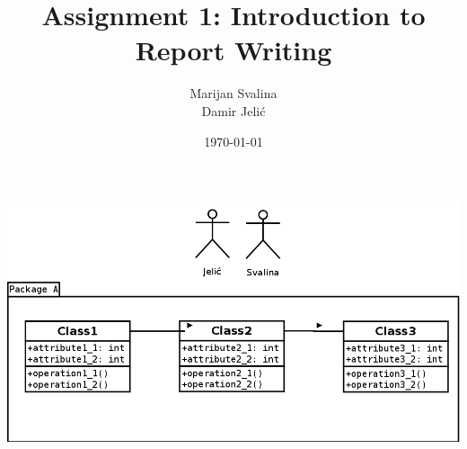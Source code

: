 \documentclass[12pt, titlepage, a4paper]{article}
\title{Assignment 1: Introduction to Report Writing}
\date{\today}
\author{Marijan Svalina \\ Damir Jelić}
\begin{document}
\maketitle 

\begin{center}
\includegraphics[scale=0.9]{lab1.png}
   \end{center}
\end{document}
